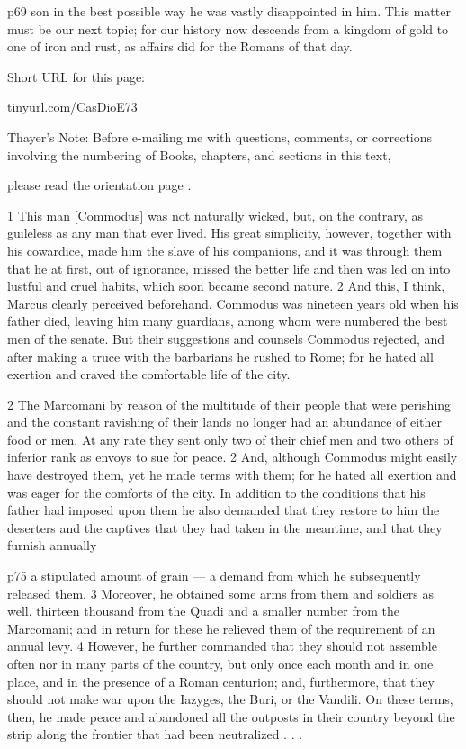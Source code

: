 p69 son in the best possible way he was vastly disappointed in him. This matter must be our next topic; for our history now descends from a kingdom of gold to one of iron and rust, as affairs did for the Romans of that day.


Short URL for this page:

tinyurl.com/CasDioE73

Thayer's Note: Before e-mailing me with questions, comments, or corrections involving the numbering of Books, chapters, and sections in this text,

please read the orientation page .


1
This man [Commodus] was not naturally wicked, but, on the contrary, as guileless as any man that ever lived. His great simplicity, however, together with his cowardice, made him the slave of his companions, and it was through them that he at first, out of ignorance, missed the better life and then was led on into lustful and cruel habits, which soon became second nature. 2 And this, I think, Marcus clearly perceived beforehand. Commodus was nineteen years old when his father died, leaving him many guardians, among whom were numbered the best men of the senate. But their suggestions and counsels Commodus rejected, and after making a truce with the barbarians he rushed to Rome; for he hated all exertion and craved the comfortable life of the city.

2
The Marcomani by reason of the multitude of their people that were perishing and the constant ravishing of their lands no longer had an abundance of either food or men. At any rate they sent only two of their chief men and two others of inferior rank as envoys to sue for peace. 2 And, although Commodus might easily have destroyed them, yet he made terms with them; for he hated all exertion and was eager for the comforts of the city. In addition to the conditions that his father had imposed upon them he also demanded that they restore to him the deserters and the captives that they had taken in the meantime, and that they furnish annually

p75 a stipulated amount of grain \texthebrew{—} a demand from which he subsequently released them. 3 Moreover, he obtained some arms from them and soldiers as well, thirteen thousand from the Quadi and a smaller number from the Marcomani; and in return for these he relieved them of the requirement of an annual levy. 4 However, he further commanded that they should not assemble often nor in many parts of the country, but only once each month and in one place, and in the presence of a Roman centurion; and, furthermore, that they should not make war upon the Iazyges, the Buri, or the Vandili. On these terms, then, he made peace and abandoned all the outposts in their country beyond the strip along the frontier that had been neutralized . . .

